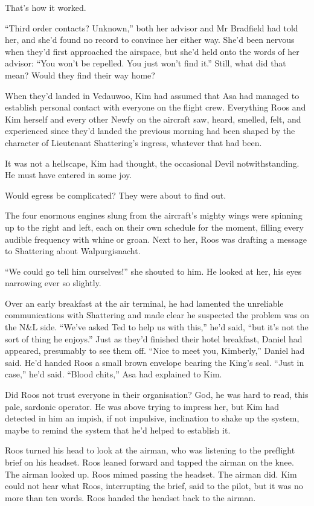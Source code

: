 \documentclass[11pt,a5paper]{article}
\begin{document}
That's how it worked.

``Third order contacts? Unknown,'' both her advisor and Mr Bradfield had told her, and she'd found no record to convince her either way. She'd been nervous when they'd first approached the airspace, but she'd held onto the words of her advisor: ``You won't be repelled. You just won't find it.'' Still, what did that mean? Would they find their way home?

When they'd landed in Vedauwoo, Kim had assumed that Asa had managed to establish personal contact with everyone on the flight crew. Everything Roos and Kim herself and every other Newfy on the aircraft saw, heard, smelled, felt, and experienced since they'd landed the previous morning had been shaped by the character of Lieutenant Shattering's ingress, whatever that had been.

It was not a hellscape, Kim had thought, the occasional Devil notwithstanding. He must have entered in some joy.

Would egress be complicated? They were about to find out.

The four enormous engines slung from the aircraft's mighty wings were spinning up to the right and left, each on their own schedule for the moment, filling every audible frequency with whine or groan. Next to her, Roos was drafting a message to Shattering about Walpurgisnacht.

``We could go tell him ourselves!'' she shouted to him. He looked at her, his eyes narrowing ever so slightly.

Over an early breakfast at the air terminal, he had lamented the unreliable communications with Shattering and made clear he suspected the problem was on the N\&L side. ``We've asked Ted to help us with this,'' he'd said, ``but it's not the sort of thing he enjoys.'' Just as they'd finished their hotel breakfast, Daniel had appeared, presumably to see them off. ``Nice to meet you, Kimberly,'' Daniel had said. He'd handed Roos a small brown envelope bearing the King's seal. ``Just in case,'' he'd said. ``Blood chits,'' Asa had explained to Kim.

Did Roos not trust everyone in their organisation? God, he was hard to read, this pale, sardonic operator. He was above trying to impress her, but Kim had detected in him an impish, if not impulsive, inclination to shake up the system, maybe to remind the system that he'd helped to establish it.

Roos turned his head to look at the airman, who was listening to the preflight brief on his headset. Roos leaned forward and tapped the airman on the knee. The airman looked up. Roos mimed passing the headset. The airman did. Kim could not hear what Roos, interrupting the brief, said to the pilot, but it was no more than ten words. Roos handed the headset back to the airman.
\end{document}
